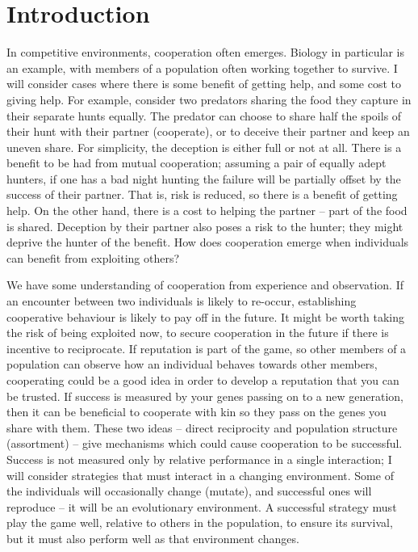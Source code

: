 \documentclass[a4paper,11pt,bcshonoursthesis,singlespace,oneside,thesisdraft,pdflatex]{cssethesis}
\begin{document}
\chapter{Introduction}
\label{sec:intro}
In competitive environments, cooperation often emerges. 
Biology in particular is an example, with members of a population often working together to survive. 
I will consider cases where there is some benefit of getting help, and some cost to giving help. 
For example, consider two predators sharing the food they capture in their separate hunts equally. 
The predator can choose to share half the spoils of their hunt with their partner (cooperate), or to deceive their partner and keep an uneven share. 
For simplicity, the deception is either full or not at all. 
There is a benefit to be had from mutual cooperation; assuming a pair of equally adept hunters, if one has a bad night hunting the failure will be partially offset by the success of their partner. 
That is, risk is reduced, so there is a benefit of getting help. 
On the other hand, there is a cost to helping the partner -- part of the food is shared. 
Deception by their partner also poses a risk to the hunter; they might deprive the hunter of the benefit.  
How does cooperation emerge when individuals can benefit from exploiting others? 
 
We have some understanding of cooperation from experience and observation. 
If an encounter between two individuals is likely to re-occur, establishing cooperative behaviour is likely to pay off in the future. 
It might be worth taking the risk of being exploited now, to secure cooperation in the future if there is incentive to reciprocate. 
If reputation is part of the game, so other members of a population can observe how an individual behaves towards other members, cooperating could be a good idea in order to develop a reputation that you can be trusted. 
If success is measured by your genes passing on to a new generation, then it can be beneficial to cooperate with kin so they pass on the genes you share with them. 
These two ideas -- direct reciprocity and population structure (assortment) -- give mechanisms which could cause cooperation to be successful. 
Success is not measured only by relative performance in a single interaction; I will consider strategies that must interact in a changing environment. 
Some of the individuals will occasionally change (mutate), and successful ones will reproduce -- it will be an evolutionary environment. 
A successful strategy must play the game well, relative to others in the population, to ensure its survival, but it must also perform well as that environment changes.
\end{document}
